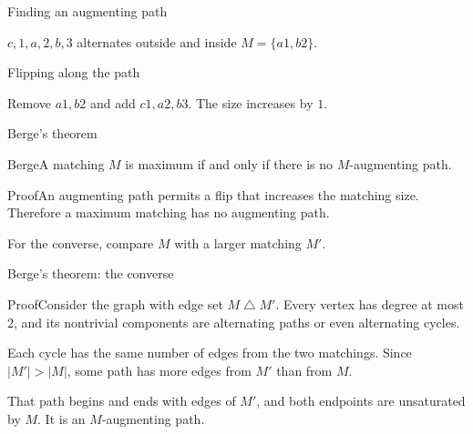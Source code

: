\documentclass[aspectratio=169,11pt]{beamer}
\newcommand{\Thm}[2]{\begin{block}{#1}#2\end{block}}
\renewcommand{\Proof}[1]{\begin{block}{Proof}\normalsize #1\end{block}}
\newcommand{\gap}{\par\medskip}
\begin{document}
\begin{frame}{Finding an augmenting path}
\large
\begin{center}\end{center}
\begin{center}$c,1,a,2,b,3$ alternates outside and inside $M=\{a1,b2\}$.\end{center}
\end{frame}
\begin{frame}{Flipping along the path}
\large
\begin{center}\end{center}
\begin{center}Remove $a1,b2$ and add $c1,a2,b3$. The size increases by $1$.\end{center}
\end{frame}
\begin{frame}{Berge's theorem}
\large
\Thm{Berge}{A matching $M$ is maximum if and only if there is no $M$-augmenting path.}
\Proof{An augmenting path permits a flip that increases the matching size. Therefore a maximum matching has no augmenting path.\gap For the converse, compare $M$ with a larger matching $M'$.}
\end{frame}
\begin{frame}{Berge's theorem: the converse}
\large
\Proof{Consider the graph with edge set $M\mathbin{\triangle}M'$. Every vertex has degree at most $2$, and its nontrivial components are alternating paths or even alternating cycles.\gap Each cycle has the same number of edges from the two matchings. Since $|M'|>|M|$, some path has more edges from $M'$ than from $M$.\gap That path begins and ends with edges of $M'$, and both endpoints are unsaturated by $M$. It is an $M$-augmenting path.}
\end{frame}
\end{document}

